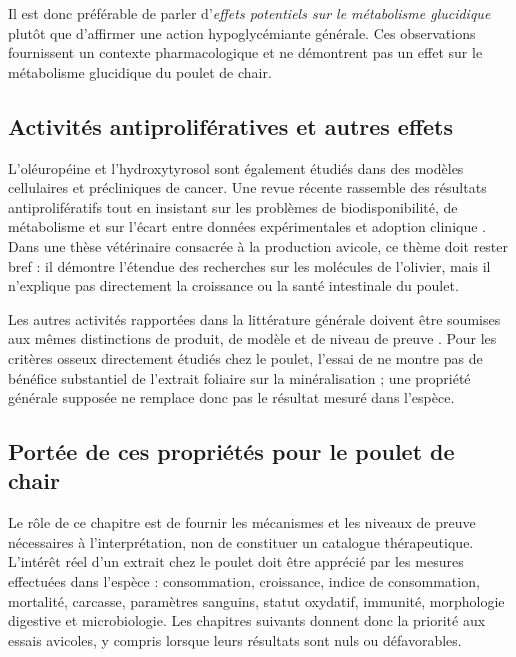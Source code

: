 Il est donc préférable de parler d'\textit{effets potentiels sur le métabolisme glucidique} plutôt que d'affirmer une action hypoglycémiante générale. Ces observations fournissent un contexte pharmacologique et ne démontrent pas un effet sur le métabolisme glucidique du poulet de chair.

\subsection{Activités antiprolifératives et autres effets}

L'oléuropéine et l'hydroxytyrosol sont également étudiés dans des modèles cellulaires et précliniques de cancer. Une revue récente rassemble des résultats antiprolifératifs tout en insistant sur les problèmes de biodisponibilité, de métabolisme et sur l'écart entre données expérimentales et adoption clinique \citep{Gervasi2024}. Dans une thèse vétérinaire consacrée à la production avicole, ce thème doit rester bref : il démontre l'étendue des recherches sur les molécules de l'olivier, mais il n'explique pas directement la croissance ou la santé intestinale du poulet.

Les autres activités rapportées dans la littérature générale doivent être soumises aux mêmes distinctions de produit, de modèle et de niveau de preuve \citep{Gokkaya2026}. Pour les critères osseux directement étudiés chez le poulet, l'essai de \citet{Leskovec2018} ne montre pas de bénéfice substantiel de l'extrait foliaire sur la minéralisation ; une propriété générale supposée ne remplace donc pas le résultat mesuré dans l'espèce.

\subsection{Portée de ces propriétés pour le poulet de chair}

Le rôle de ce chapitre est de fournir les mécanismes et les niveaux de preuve nécessaires à l'interprétation, non de constituer un catalogue thérapeutique. L'intérêt réel d'un extrait chez le poulet doit être apprécié par les mesures effectuées dans l'espèce : consommation, croissance, indice de consommation, mortalité, carcasse, paramètres sanguins, statut oxydatif, immunité, morphologie digestive et microbiologie. Les chapitres suivants donnent donc la priorité aux essais avicoles, y compris lorsque leurs résultats sont nuls ou défavorables.
